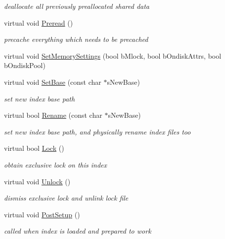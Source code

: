 \begin{DoxyCompactItemize}
\begin{DoxyCompactList}\small\item\em deallocate all previously preallocated shared data \end{DoxyCompactList}\item 
virtual void \hyperlink{classCSphIndex__VLN_a8c884a54057466eca5993ab48015513e}{Preread} ()
\begin{DoxyCompactList}\small\item\em precache everything which needs to be precached \end{DoxyCompactList}\item 
virtual void \hyperlink{classCSphIndex__VLN_a0462c2281e279ee294fff7235bb18082}{Set\-Memory\-Settings} (bool b\-Mlock, bool b\-Ondisk\-Attrs, bool b\-Ondisk\-Pool)
\item 
virtual void \hyperlink{classCSphIndex__VLN_a83345cc90af465c5fd14c0b6fb2e6e79}{Set\-Base} (const char $\ast$s\-New\-Base)
\begin{DoxyCompactList}\small\item\em set new index base path \end{DoxyCompactList}\item 
virtual bool \hyperlink{classCSphIndex__VLN_a1c3c39c6636241309471d3c4e30916c0}{Rename} (const char $\ast$s\-New\-Base)
\begin{DoxyCompactList}\small\item\em set new index base path, and physically rename index files too \end{DoxyCompactList}\item 
virtual bool \hyperlink{classCSphIndex__VLN_a48705bf60dc7b395e6e05758ae400105}{Lock} ()
\begin{DoxyCompactList}\small\item\em obtain exclusive lock on this index \end{DoxyCompactList}\item 
virtual void \hyperlink{classCSphIndex__VLN_a0abb4876490ea0ce0a5838c7f6b821f0}{Unlock} ()
\begin{DoxyCompactList}\small\item\em dismiss exclusive lock and unlink lock file \end{DoxyCompactList}\item 
virtual void \hyperlink{classCSphIndex__VLN_a71cf032470305674c9e433246a7f45e0}{Post\-Setup} ()
\begin{DoxyCompactList}\small\item\em called when index is loaded and prepared to work \end{DoxyCompactList}\item 

\end{DoxyCompactItemize}
